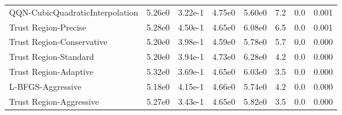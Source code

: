 \documentclass{article}
\begin{document}
\begin{table}[htbp]
{\begin{tabular}{p{2.5cm}*{7}{c}}
QQN-CubicQuadraticInterpolation & 5.26e0 & 3.22e-1 & 4.75e0 & 5.60e0 & 7.2 & 0.0 & 0.001 \\
Trust Region-Precise & 5.28e0 & 4.50e-1 & 4.65e0 & 6.08e0 & 6.5 & 0.0 & 0.001 \\
Trust Region-Conservative & 5.20e0 & 3.98e-1 & 4.59e0 & 5.78e0 & 5.7 & 0.0 & 0.000 \\
Trust Region-Standard & 5.20e0 & 3.94e-1 & 4.73e0 & 6.28e0 & 4.2 & 0.0 & 0.000 \\
Trust Region-Adaptive & 5.32e0 & 3.69e-1 & 4.65e0 & 6.03e0 & 3.5 & 0.0 & 0.000 \\
L-BFGS-Aggressive & 5.18e0 & 4.15e-1 & 4.66e0 & 5.74e0 & 4.2 & 0.0 & 0.000 \\
Trust Region-Aggressive & 5.27e0 & 3.43e-1 & 4.65e0 & 5.82e0 & 3.5 & 0.0 & 0.000 \\
\bottomrule
\end{tabular}
}
\end{table}
\end{document}
